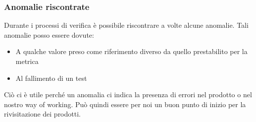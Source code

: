 		\subsubsection{Anomalie riscontrate}\label{Anomalie}
		Durante i processi di verifica è possibile riscontrare a volte alcune anomalie.
		Tali anomalie posso essere dovute:
		\begin{itemize}
			\item A qualche valore preso come riferimento diverso da quello prestabilito per la metrica
			\item Al fallimento di un test
		\end{itemize}
		Ciò ci è utile perché un anomalia ci indica la presenza di errori nel prodotto o nel nostro way of working. Può quindi essere per noi un buon punto di inizio per la rivisitazione dei prodotti.
